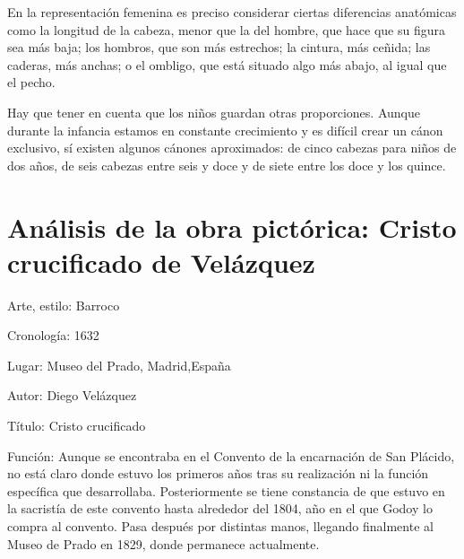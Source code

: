 \documentclass[a4paper,12pt]{article} %
\begin{document}
En la representación femenina es preciso considerar ciertas diferencias anatómicas como la longitud de la cabeza, menor que la del hombre, que hace que su figura sea más baja; los hombros, que son más estrechos; la cintura, más ceñida; las caderas, más anchas; o el ombligo, que está situado algo más abajo, al igual que el pecho.

Hay que tener en cuenta que los niños guardan otras proporciones. Aunque durante la infancia estamos en constante crecimiento y es difícil crear un cánon exclusivo, sí existen algunos cánones aproximados: de cinco cabezas para niños de dos años, de seis cabezas entre seis y doce y de siete entre los doce y los quince.



\newpage

\section{Análisis de la obra pictórica: Cristo crucificado de Velázquez } 

Arte, estilo: Barroco

Cronología: 1632

Lugar: Museo del Prado, Madrid,España

Autor: Diego Velázquez

Título: Cristo crucificado

Función: Aunque se encontraba en el Convento de la encarnación de San Plácido, no está claro donde estuvo los primeros años tras su realización ni la función específica que desarrollaba. Posteriormente se tiene constancia de que estuvo en la sacristía de este convento hasta alrededor del 1804, año en el que Godoy lo compra al convento. Pasa después por distintas manos, llegando finalmente al Museo de Prado en 1829, donde permanece actualmente. %
\end{document}
